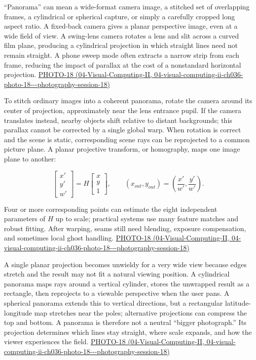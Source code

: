 ``Panorama'' can mean a wide-format camera image, a stitched set of overlapping frames, a cylindrical or spherical capture, or simply a carefully cropped long aspect ratio. A fixed-back camera gives a planar perspective image, even at a wide field of view. A swing-lens camera rotates a lens and slit across a curved film plane, producing a cylindrical projection in which straight lines need not remain straight. A phone sweep mode often extracts a narrow strip from each frame, reducing the impact of parallax at the cost of a nonstandard horizontal projection. \href{../04-Visual-Computing-II/main.pdf\#nameddest=04-visual-computing-ii-ch036-photo-18---photography-session-18}{PHOTO-18 (04-Visual-Computing-II, 04-visual-computing-ii-ch036-photo-18-\/-\/-photography-session-18)}

To stitch ordinary images into a coherent panorama, rotate the camera around its center of projection, approximately near the lens entrance pupil. If the camera translates instead, nearby objects shift relative to distant backgrounds; this parallax cannot be corrected by a single global warp. When rotation is correct and the scene is static, corresponding scene rays can be reprojected to a common picture plane. A planar projective transform, or homography, maps one image plane to another:

\[
\begin{bmatrix}x'\\y'\\w'\end{bmatrix}
=H\begin{bmatrix}x\\y\\1\end{bmatrix},\qquad
(x_{out},y_{out})=\left(\frac{x'}{w'},\frac{y'}{w'}\right).
\]

Four or more corresponding points can estimate the eight independent parameters of \(H\) up to scale; practical systems use many feature matches and robust fitting. After warping, seams still need blending, exposure compensation, and sometimes local ghost handling. \href{../04-Visual-Computing-II/main.pdf\#nameddest=04-visual-computing-ii-ch036-photo-18---photography-session-18}{PHOTO-18 (04-Visual-Computing-II, 04-visual-computing-ii-ch036-photo-18-\/-\/-photography-session-18)}

A single planar projection becomes unwieldy for a very wide view because edges stretch and the result may not fit a natural viewing position. A cylindrical panorama maps rays around a vertical cylinder, stores the unwrapped result as a rectangle, then reprojects to a viewable perspective when the user pans. A spherical panorama extends this to vertical directions, but a rectangular latitude-longitude map stretches near the poles; alternative projections can compress the top and bottom. A panorama is therefore not a neutral ``bigger photograph.'' Its projection determines which lines stay straight, where scale expands, and how the viewer experiences the field. \href{../04-Visual-Computing-II/main.pdf\#nameddest=04-visual-computing-ii-ch036-photo-18---photography-session-18}{PHOTO-18 (04-Visual-Computing-II, 04-visual-computing-ii-ch036-photo-18-\/-\/-photography-session-18)}

